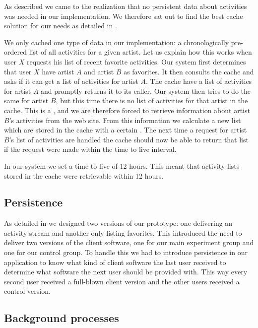 As described we came to the realization that no persistent data
about activities was needed in our implementation.
We therefore sat out to find the best cache solution for our needs as detailed
in .

We only cached one type of data in our implementation:
a chronologically pre-ordered list of all activities for a given artist.
Let us explain how this works
when user $X$ requests his list of recent favorite activities. Our system
first determines that user $X$ have artist $A$ and artist $B$ as
favorites. It then consults the cache and asks if it can get a list of
activities for artist $A$. The cache have a list of activities for artist $A$
and promptly returns it to its caller. Our system then tries to do the same
for artist $B$, but this time there is no list of activities for that artist
in the cache. This is a , and we are therefore forced to
retrieve information about artist $B$'s activities from the \urort{} web site.
From this information we calculate a new list which are stored in the cache
with a certain
. The next time a request for artist $B$'s list of
activities are handled the cache should now be able to return that list
if the request were made within the time to live interval.

In our system we set a time to live of 12 hours. This meant that activity
lists stored in the cache were retrievable within 12 hours.

\subsection{Persistence}

As detailed in
we designed two versions of our prototype: one delivering an activity
stream and another only listing favorites. This introduced the need to deliver
two versions of the client software, one for our main experiment group and one
for our control group. To handle this we had to introduce persistence in our
application to know what kind of client software the last user received to
determine what software the next user should be provided with. This way every
second user received a full-blown client version and the other users received
a control version.

\subsection{Background processes}
\label{section:implementation.architecture.background.process}

